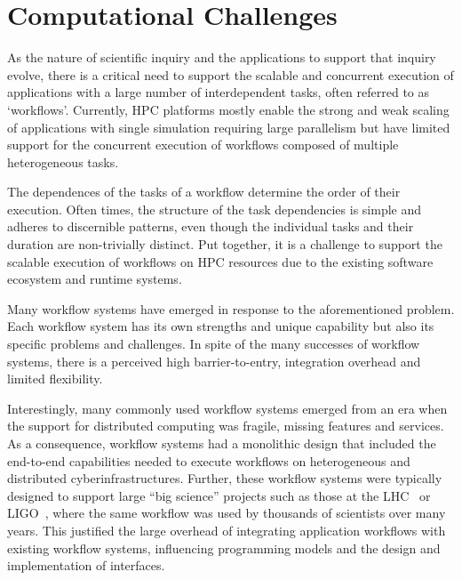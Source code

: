 \documentclass[conference]{IEEEtran}
\begin{document}



\section{Computational Challenges}\label{sec:cc}



As the nature of scientific inquiry and the applications to support that
inquiry evolve, there is a critical need to support the scalable and
concurrent execution of applications with a large number of interdependent
tasks, often referred to as `workflows'. Currently, HPC platforms mostly
enable the strong and weak scaling of applications with single simulation
requiring large parallelism but have limited support for the concurrent
execution of workflows composed of multiple heterogeneous tasks.

The dependences of the tasks of a workflow determine the order of their
execution. Often times, the structure of the task dependencies is simple and
adheres to discernible patterns, even though the individual tasks and their
duration are non-trivially distinct. Put together, it is a challenge to
support the scalable execution of workflows on HPC resources due to the
existing software ecosystem and runtime systems.

Many workflow systems have emerged in response to the aforementioned problem.
Each workflow system has its own strengths and unique capability but also its
specific problems and challenges. In spite of the many successes of workflow
systems, there is a perceived high barrier-to-entry, integration overhead and
limited flexibility.

Interestingly, many commonly used workflow systems emerged from an era when
the support for distributed computing was fragile, missing features and
services. As a consequence, workflow systems had a monolithic design that
included the end-to-end capabilities needed to execute workflows on
heterogeneous and distributed cyberinfrastructures. Further, these workflow
systems were typically designed to support large ``big science'' projects
such as those at the LHC~\cite{breskin2009cern} or
LIGO~\cite{althouse1992ligo}, where the same workflow was used by thousands
of scientists over many years. This justified the large overhead of
integrating application workflows with existing workflow systems, influencing
programming models and the design and implementation of interfaces.
\end{document}
